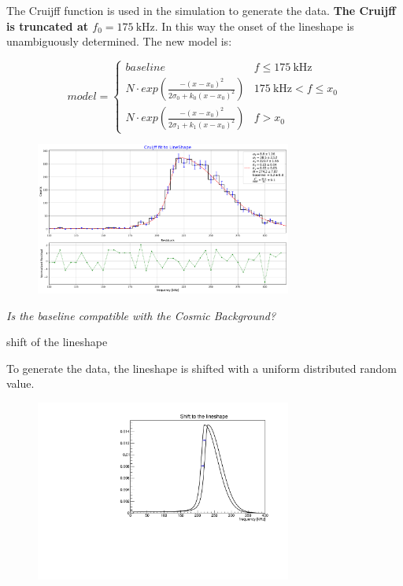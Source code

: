 \documentclass[8pt]{beamer}
\newcommand{\nologo}{\setbeamertemplate{logo}{}}
\begin{document}
\begin{frame}

The Cruijff function is used in the simulation to generate the data. \textbf{The Cruijff is truncated at $f_{0} = \SI{175}{\kilo \hertz}$}. In this way the onset of the lineshape is unambiguously determined. The new model is:

\begin{equation}
model =
\begin{cases}
baseline 	& f \leqslant \SI{175}{\kilo \hertz} \\
N \cdot exp(  \frac{-(x - x_{0})^2}{2\sigma_{0} + k_{0}(x - x_{0})^{2}}) & \SI{175}{\kilo \hertz} < f \leqslant x_{0} \\
N \cdot exp(  \frac{-(x - x_{0})^2}{2\sigma_{1} + k_{1}(x - x_{0})^{2}}) &  f >  x_{0}
\end{cases}
\end{equation}

\begin{figure}[hbtp]
\centering
\includegraphics[width = 0.75\textwidth]{../LineShape/Plot/TruncatedLineShape.pdf}
\end{figure}

\textit{Is the baseline compatible with the Cosmic Background?}
\end{frame}

{\nologo
\begin{frame}{shift of the lineshape}

To generate the data, the lineshape is shifted with a uniform distributed random value.

\begin{figure}[hbtp]
\centering
\includegraphics[width = 0.75\textwidth]{ShiftedLineshape.pdf}
\end{figure}

\end{frame}
}
\end{document}
